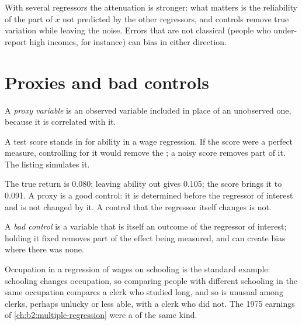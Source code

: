 With several regressors the attenuation is stronger: what matters is the reliability of the part of $x$ not predicted by
the other regressors, and controls remove true variation while leaving the noise. Errors that are not classical (people
who under-report high incomes, for instance) can bias in either direction.

\section{Proxies and bad controls}\label{sec:b2:specification:controls}

\begin{definition}\label{def:b2:specification:proxy}
A \emph{proxy variable} is an observed variable included in place of an unobserved one, because it
is correlated with it.
\end{definition}

A test score stands in for ability in a wage regression. If the score were a perfect measure, controlling for it would
remove the ; a noisy score removes part of it. The listing simulates it.

\label{lst:b2:specification:proxy}

\label{out:b2:specification:proxy}

The true return is 0.080; leaving ability out gives 0.105; the score brings it to 0.091. A proxy is a good control: it
is determined before the regressor of interest and is not changed by it. A control that the regressor itself changes is
not.

\begin{definition}\label{def:b2:specification:bad-control}
A \emph{bad control} is a variable that is itself an outcome of the regressor of interest; holding it
fixed removes part of the effect being measured, and can create bias where there was none.
\end{definition}

Occupation in a regression of wages on schooling is the standard example: schooling changes occupation, so comparing
people with different schooling in the same occupation compares a clerk who studied long, and so is unusual among clerks,
perhaps unlucky or less able, with a clerk who did not. The 1975 earnings of \cref{ch:b2:multiple-regression} were a  of the same kind.

